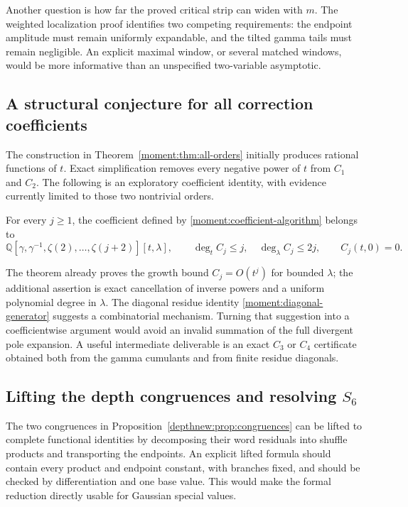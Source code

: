 Another question is how far the proved critical strip can widen with
\(m\). The weighted localization proof identifies two competing
requirements: the endpoint amplitude must remain uniformly
expandable, and the tilted gamma tails must remain negligible.
An explicit maximal window, or several matched windows, would be
more informative than an unspecified two-variable asymptotic.

\subsection{A structural conjecture for all correction coefficients}
The construction in Theorem~\ref{moment:thm:all-orders} initially
produces rational functions of \(t\). Exact simplification removes
every negative power of \(t\) from \(C_1\) and \(C_2\). The following
is an exploratory coefficient identity, with evidence currently
limited to those two nontrivial orders.

\begin{conjecture}
\label{future:conj:polynomial}
For every \(j\ge1\), the coefficient defined by
\eqref{moment:coefficient-algorithm} belongs to
\[
 \mathbb Q[\gamma,\gamma^{-1},\zeta(2),\ldots,\zeta(j+2)]
       [t,\lambda],
 \qquad
 \deg_t C_j\le j,\quad \deg_\lambda C_j\le2j,
 \qquad C_j(t,0)=0.
\]
\end{conjecture}

The theorem already proves the growth bound \(C_j=O(t^j)\) for
bounded \(\lambda\); the additional assertion is exact cancellation
of inverse powers and a uniform polynomial degree in \(\lambda\).
The diagonal residue identity
\eqref{moment:diagonal-generator} suggests a combinatorial mechanism.
Turning that suggestion into a coefficientwise argument would avoid
an invalid summation of the full divergent pole expansion.
A useful intermediate deliverable is an exact \(C_3\) or \(C_4\)
certificate obtained both from the gamma cumulants and from
finite residue diagonals.

\subsection{Lifting the depth congruences and resolving \texorpdfstring{\(S_6\)}{S6}}
The two congruences in Proposition~\ref{depthnew:prop:congruences}
can be lifted to complete functional identities by decomposing their
word residuals into shuffle products and transporting the endpoints.
An explicit lifted formula should contain every product and endpoint
constant, with branches fixed, and should be checked by differentiation
and one base value. This would make the formal reduction directly
usable for Gaussian special values.

